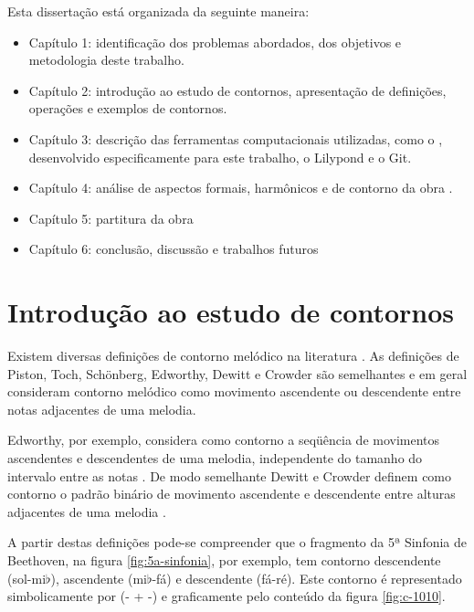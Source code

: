 Esta dissertação está organizada da seguinte maneira:

\begin{itemize}
\item Capítulo 1: identificação dos problemas abordados, dos objetivos
  e metodologia deste trabalho.
\item Capítulo 2: introdução ao estudo de contornos, apresentação de
  definições, operações e exemplos de contornos.
\item Capítulo 3: descrição das ferramentas computacionais utilizadas,
  como o \goiaba{}, desenvolvido especificamente para este trabalho, o
  Lilypond e o Git.
\item Capítulo 4: análise de aspectos formais, harmônicos e de
  contorno da obra \obra{}.
\item Capítulo 5: partitura da obra \obra{}
\item Capítulo 6: conclusão, discussão e trabalhos futuros
\end{itemize}

\chapter{Introdução ao estudo de contornos}
\label{cha:introducao-estudo-contornos}

Existem diversas definições de contorno melódico na literatura
\cite{piston59:harmony,toch77:shaping,schonberg:fundamentals,adams76:melodic,edworthy85:musical,dewitt.ea86:recognition,marvin.ea87:relating,morris87:composition,clifford95:contour,beard03:contour}.
As definições de Piston, Toch, Schönberg, Edworthy, Dewitt e Crowder
são semelhantes e em geral consideram contorno melódico como movimento
ascendente ou descendente entre notas adjacentes de uma melodia.

Edworthy, por exemplo, considera como contorno a seqüência de
movimentos ascendentes e descendentes de uma melodia, independente do
tamanho do intervalo entre as notas \cite{edworthy85:musical}. De modo
semelhante Dewitt e Crowder definem como contorno o padrão binário de
movimento ascendente e descendente entre alturas adjacentes de uma
melodia \cite{dewitt.ea86:recognition}.

A partir destas definições pode-se compreender que o fragmento da 5ª
Sinfonia de Beethoven, na figura \ref{fig:5a-sinfonia}, por exemplo,
tem contorno descendente (sol-mi$\flat$), ascendente (mi$\flat$-fá) e
descendente (fá-ré). Este contorno é representado simbolicamente por
(- + -) e graficamente pelo conteúdo da figura \ref{fig:c-1010}.

